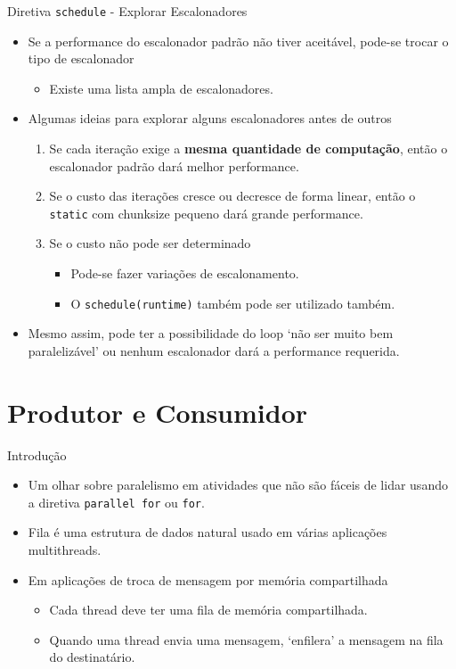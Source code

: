 	\begin{frame}{Diretiva {\tt schedule} - Explorar Escalonadores}
		\begin{itemize}
			\setlength\itemsep{1em}
			\item Se a performance do escalonador padrão não tiver aceitável, pode-se trocar o tipo de escalonador
			\begin{itemize}
				\item Existe uma lista ampla de escalonadores.
			\end{itemize}
			\item Algumas ideias para explorar alguns escalonadores antes de outros
			\begin{enumerate}
				\setlength\itemsep{0.8em}
				\item Se cada iteração exige a \textbf{mesma quantidade de computação}, então o escalonador padrão dará melhor performance.
				\item Se o custo das iterações cresce ou decresce de forma linear, então o {\tt static} com chunksize pequeno dará grande performance.
				\item Se o custo não pode ser determinado
				\begin{itemize}
				 	\item Pode-se fazer variações de escalonamento. 
				 	\item O {\tt schedule(runtime)} também pode ser utilizado também.
				 \end{itemize} 
			\end{enumerate}
					\bigskip
					\pause
			\item Mesmo assim, pode ter a possibilidade do loop `não ser muito bem paralelizável' ou nenhum escalonador dará a performance requerida.
		\end{itemize}
	\end{frame}









\section{Produtor e Consumidor}
	\begin{frame}{Introdução}
		\begin{itemize}
			\item Um olhar sobre paralelismo em atividades que não são fáceis de lidar usando a diretiva {\tt parallel for} ou {\tt for}.
			\bigskip
			\item Fila é uma estrutura de dados natural usado em várias aplicações multithreads.
			\item Em aplicações de troca de mensagem por memória compartilhada
			\begin{itemize}
				\item Cada thread deve ter uma fila de memória compartilhada.
				\item Quando uma thread envia uma mensagem, `enfilera' a mensagem na fila do destinatário.
			\end{itemize}
		\end{itemize}
	\end{frame}

